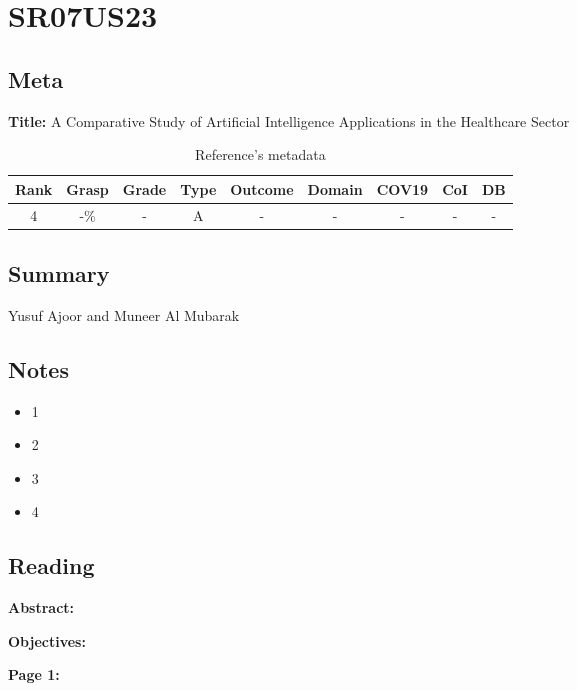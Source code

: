 \section{ SR07US23 }


\subsection{Meta}

    \textbf{Title:}
    A Comparative Study of Artificial Intelligence Applications in the Healthcare Sector

    \begin{table}[H]
        \centering
        \begin{tabular}{|c|c|c|c|c|c|c|c|c|}
            \hline
                \textbf{Rank} & \textbf{Grasp} & \textbf{Grade} & \textbf{Type} & \textbf{Outcome} & \textbf{Domain} & \textbf{COV19} & \textbf{CoI} & \textbf{DB} \\
            \hline
                4 & -\% & - & A & - & - & - & - & - \\
            \hline
        \end{tabular}
        \caption{Reference's metadata}
        \label{tab:SR07US23}
    \end{table}

\subsection{Summary}
    Yusuf Ajoor and Muneer Al Mubarak \cite{x101}

\subsection{Notes}
    \begin{itemize}
        \item 1
        \item 2
        \item 3
        \item 4
    \end{itemize}


\subsection{Reading}
    \textbf{Abstract:}

    
    \textbf{Objectives:}

    
    \textbf{Page 1:}
    